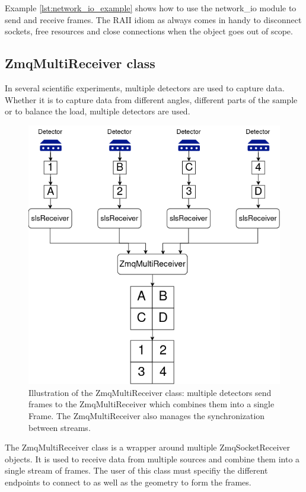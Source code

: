 \documentclass[./chapitre3.tex]{subfiles}
\begin{document}
Example \ref{lst:network_io_example} shows how to use the network\_io module to send and receive frames.
The RAII idiom as always comes in handy to disconnect sockets, free resources and close connections when the
object goes out of scope.\\


\subsection{ZmqMultiReceiver class}
In several scientific experiments, multiple detectors are used to capture data. Whether
it is to capture data from different angles, different parts of the sample or to balance
the load, multiple detectors are used.\\

\begin{figure}
    \centering
    \includegraphics[width=\textwidth]{Chapitre3/figures/zmqmulti.png}
    \caption{Illustration of the ZmqMultiReceiver class: multiple detectors send frames to the ZmqMultiReceiver
        which combines them into a single Frame. The ZmqMultiReceiver also manages the synchronization between streams.}
    \label{fig:zmq_multi_receiver}
\end{figure}

The ZmqMultiReceiver class is a wrapper around multiple ZmqSocketReceiver objects. It is used
to receive data from multiple sources and combine them into a single stream of frames. The user of this class
must specifiy the different endpoints to connect to as well as the geometry to form the frames.\\
\end{document}
